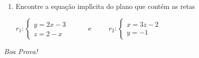 \documentclass[a4paper,5pt]{amsbook}
\begin{document}
\begin{enumerate}
	\vspace{0.5cm}
	\item Encontre a equa\c{c}\~ao impl\'{\i}cita do plano que cont\'em as retas

		$r_1:\left\{\begin{array}{l}
				y = 2x - 3 \\
				z = 2 - x
			\end{array}\right.$
		\ \ \ \ \ e\ \ \ \ \ 
		$r_2:\left\{\begin{array}{l}
				x = 3z-2 \\
				y = -1
			\end{array}\right.$

\end{enumerate}

\begin{flushright}
	\vspace{1cm}
	\textit{Boa Prova!}
\end{flushright}
\end{document}
